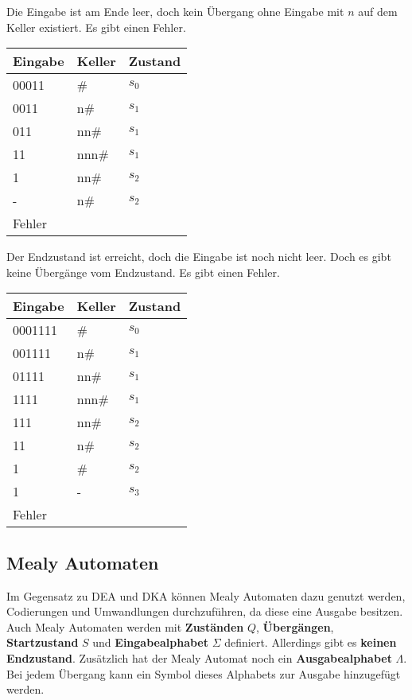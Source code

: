Die Eingabe ist am Ende leer, doch kein Übergang ohne Eingabe mit $n$
auf dem Keller existiert. Es gibt einen Fehler.

\begin{table}[h]
    \begin{tabular}{|l|l|l|}
    \hline
    Eingabe & Keller & Zustand \\ \hline
    00011 & \# & $s_0$ \\ \hline
    0011 & n\# & $s_1$ \\ \hline
    011 & nn\# & $s_1$ \\ \hline
    11 & nnn\# & $s_1$ \\ \hline
    1 & nn\# & $s_2$ \\ \hline
    - & n\# & $s_2$ \\ \hline
    \multicolumn{3}{|l|}{Fehler} \\ \hline
    \end{tabular}
\end{table}

Der Endzustand ist erreicht, doch die Eingabe ist noch nicht leer.
Doch es gibt keine Übergänge vom Endzustand. Es gibt einen Fehler.

\begin{table}[h]
    \begin{tabular}{|l|l|l|}
    \hline
    Eingabe & Keller & Zustand \\ \hline
    0001111 & \# & $s_0$ \\ \hline
    001111 & n\# & $s_1$ \\ \hline
    01111 & nn\# & $s_1$ \\ \hline
    1111 & nnn\# & $s_1$ \\ \hline
    111 & nn\# & $s_2$ \\ \hline
    11 & n\# & $s_2$ \\ \hline
    1 & \# & $s_2$ \\ \hline
    1 & - & $s_3$ \\ \hline
    \multicolumn{3}{|l|}{Fehler} \\ \hline
\end{tabular}
\end{table}

\clearpage

\subsection{Mealy Automaten}

Im Gegensatz zu DEA und DKA können Mealy Automaten dazu genutzt werden,
Codierungen und Umwandlungen durchzuführen, da diese eine Ausgabe besitzen.
Auch Mealy Automaten werden mit \textbf{Zuständen} $Q$, \textbf{Übergängen},
\textbf{Startzustand} $S$ und \textbf{Eingabealphabet} $\Sigma$
definiert. Allerdings gibt es \textbf{keinen Endzustand}.
Zusätzlich hat der Mealy Automat noch ein \textbf{Ausgabealphabet} $\Lambda$.
Bei jedem Übergang kann ein Symbol dieses Alphabets zur Ausgabe hinzugefügt werden.


